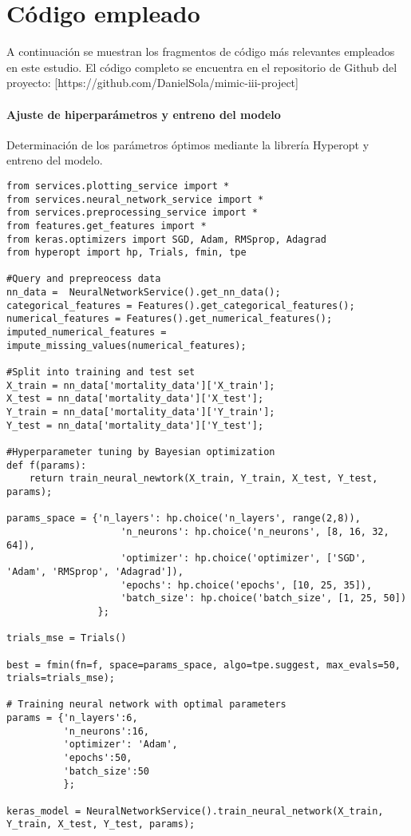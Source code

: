 \documentclass{report}
\begin{document}
\section{Código empleado}

A continuación se muestran los fragmentos de código más relevantes empleados en este estudio. El código completo se encuentra en el repositorio de Github del proyecto:  [https://github.com/DanielSola/mimic-iii-project]

\paragraph{Ajuste de hiperparámetros y entreno del modelo}

Determinación de los parámetros óptimos mediante la librería Hyperopt y entreno del modelo. 

\begin{verbatim}
from services.plotting_service import *
from services.neural_network_service import *
from services.preprocessing_service import *
from features.get_features import *
from keras.optimizers import SGD, Adam, RMSprop, Adagrad
from hyperopt import hp, Trials, fmin, tpe

#Query and prepreocess data
nn_data =  NeuralNetworkService().get_nn_data();
categorical_features = Features().get_categorical_features();
numerical_features = Features().get_numerical_features();
imputed_numerical_features = impute_missing_values(numerical_features);

#Split into training and test set
X_train = nn_data['mortality_data']['X_train'];
X_test = nn_data['mortality_data']['X_test'];
Y_train = nn_data['mortality_data']['Y_train'];
Y_test = nn_data['mortality_data']['Y_test'];

#Hyperparameter tuning by Bayesian optimization
def f(params):
    return train_neural_newtork(X_train, Y_train, X_test, Y_test, params);

params_space = {'n_layers': hp.choice('n_layers', range(2,8)),
                    'n_neurons': hp.choice('n_neurons', [8, 16, 32, 64]),
                    'optimizer': hp.choice('optimizer', ['SGD', 'Adam', 'RMSprop', 'Adagrad']),
                    'epochs': hp.choice('epochs', [10, 25, 35]),
                    'batch_size': hp.choice('batch_size', [1, 25, 50])
                };

trials_mse = Trials()

best = fmin(fn=f, space=params_space, algo=tpe.suggest, max_evals=50, trials=trials_mse);

# Training neural network with optimal parameters
params = {'n_layers':6,
          'n_neurons':16,
          'optimizer': 'Adam',
          'epochs':50,
          'batch_size':50
          };
          
keras_model = NeuralNetworkService().train_neural_network(X_train, Y_train, X_test, Y_test, params);

\end{verbatim}
\end{document}
